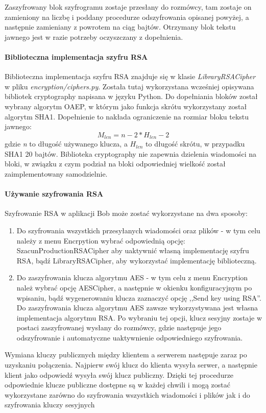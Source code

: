 \documentclass{article}
\begin{document}
        Zaszyfrowany blok szyfrogramu zostaje przesłany do rozmówcy, tam zostaje on zamieniony na liczbę i poddany
        procedurze odszyfrowania opisanej powyżej, a następnie zamieniany z powrotem na ciąg bajtów. Otrzymany blok tekstu
        jawnego jest w razie potrzeby oczyszczany z dopełnienia.

      \paragraph{Biblioteczna implementacja szyfru RSA}
        Biblioteczna implementacja szyfru RSA znajduje się w klasie \emph{LibraryRSACipher} w pliku \emph{encryption/ciphers.py}.
        Została tutaj wykorzystana wcześniej opisywana bibliotek cryptography napisana w języku Python. Do dopełniania
        bloków został wybrany algorytm OAEP, w którym jako funkcja skrótu wykorzystany został algorytm SHA1. Dopełnienie
        to nakłada ograniczenie na rozmiar bloku tekstu jawnego:
        \begin{equation}
            M_{len} = n - 2 * H_{len} - 2
        \end{equation}
        gdzie \emph{n} to długość używanego klucza, a \( H_{len} \) to długość skrótu, w przypadku SHA1 20 bajtów.
        Biblioteka cryptography nie zapewnia dzielenia wiadomości na bloki, w związku z czym podział na bloki odpowiedniej
        wielkość został zaimplementowany samodzielnie.

        \paragraph{Używanie szyfrowania RSA}
        Szyfrowanie RSA w aplikacji Bob może zostać wykorzystane na dwa sposoby:
        \begin{enumerate}
          \item Do szyfrowania wszystkich przesyłanych wiadomości oraz plików - w tym celu należy z menu Encrpytion
            wybrać odpowiednią opcję: SzacunProductionRSACipher aby uaktywnić własną implementację szyfru RSA,
            bądź LibraryRSACipher, aby wykorzystać implementację biblioteczną.
          \item Do zaszyfrowania klucza algorytmu AES - w tym celu z menu Encryption należ wybrać opcję AESCipher,
            a następnie w okienku konfiguracyjnym po wpisaniu, bądź wygenerowaniu klucza zaznaczyć opcję
            ,,Send key using RSA''. Do zaszyfrowania klucza algorytmu AES zawsze wykorzystywana jest własna
            implementacja algorytmu RSA. Po wybraniu tej opcji, klucz sesyjny zostaje w postaci zaszyfrowanej
            wysłany do rozmówcy, gdzie następuje jego odszyfrowanie i automatyczne uaktywnienie odpowiedniego szyfrowania.
        \end{enumerate}
        Wymiana kluczy publicznych między klientem a serwerem następuje zaraz po uzyskaniu połączenia. Najpierw swój
        klucz do klienta wysyła serwer, a następnie klient jako odpowiedź wysyła swój klucz publiczny. Dzięki tej
        procedurze odpowiednie klucze publiczne dostępne są w każdej chwili i mogą zostać wykorzystane zarówno
        do szyfrowania wszystkich wiadomości i plików jak i do szyfrowania kluczy sesyjnych
\end{document}
